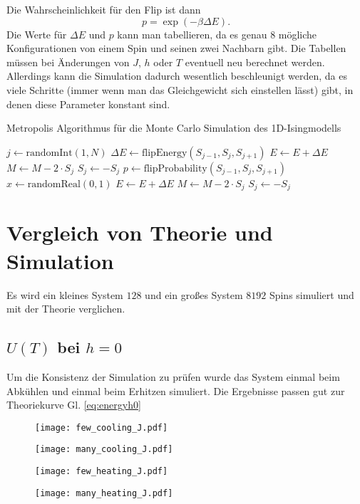 		Die Wahrscheinlichkeit für den Flip ist dann
		\begin{equation*}
				p=\exp\left(-\beta\Delta E\right).
		\end{equation*}
		Die Werte für $\Delta E$ und $p$ kann man tabellieren, da es genau $8$ mögliche Konfigurationen von einem Spin und seinen zwei Nachbarn gibt. Die Tabellen müssen bei Änderungen von $J$, $h$ oder $T$ eventuell neu berechnet werden. Allerdings kann die Simulation dadurch wesentlich beschleunigt werden, da es viele Schritte (immer wenn man das Gleichgewicht sich einstellen lässt) gibt, in denen diese Parameter konstant sind.
		\begin{algorithm}[ht]
				\caption{Metropolis Algorithmus für die Monte Carlo Simulation des 1D-Isingmodells}\label{alg:metropolis}
				\begin{algorithmic}[1]
								\State $j \gets \mathrm{randomInt}\left(1, N\right)$
								\State $\Delta E \gets \mathrm{flipEnergy}\left(S_{j-1}, S_j, S_{j+1}\right)$
										\State $E \gets E+\Delta E$
										\State $M \gets M-2\cdot S_j$
								  \State $S_j \gets -S_j$
								\Else
								  \State $p \gets \mathrm{flipProbability}\left(S_{j-1}, S_j, S_{j+1}\right)$
										\State $x \gets \mathrm{randomReal}\left(0, 1\right)$
										  \State $E \gets E+\Delta E$
  										\State $M \gets M-2\cdot S_j$
		  						  \State $S_j \gets -S_j$
										\EndIf
								\EndIf
						\EndProcedure{}
				\end{algorithmic}
		\end{algorithm}
		\FloatBarrier{}

		\section{Vergleich von Theorie und Simulation}
		Es wird ein kleines System $128$ und ein großes System $8192$ Spins simuliert und mit der Theorie verglichen.
		\subsection{$U\left(T\right)$ bei $h=0$}
		Um die Konsistenz der Simulation zu prüfen wurde das System einmal beim Abkühlen und einmal beim Erhitzen simuliert. Die Ergebnisse passen gut zur Theoriekurve Gl. \eqref{eq:energyh0}
		\begin{figure}[ht]
				\centering
				\texttt{[image: few\_cooling\_J.pdf]}
		\end{figure}
		\begin{figure}[ht]
				\centering
				\texttt{[image: many\_cooling\_J.pdf]}
		\end{figure}
		\begin{figure}[ht]
				\centering
				\texttt{[image: few\_heating\_J.pdf]}
		\end{figure}
		\begin{figure}[ht]
				\centering
				\texttt{[image: many\_heating\_J.pdf]}
		\end{figure}
		\FloatBarrier{}

